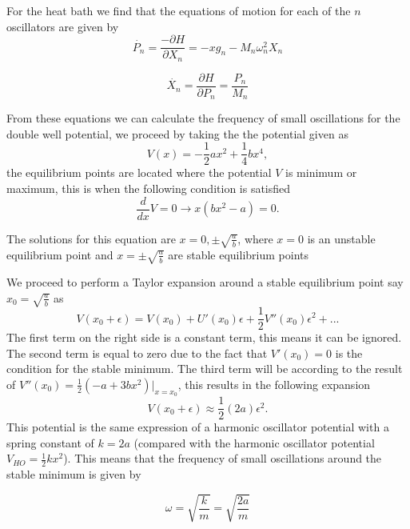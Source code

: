For the heat bath we find that the equations of motion for each of the $n$ oscillators are given by
\begin{equation}
\dot{P_n}=\frac{-\partial H}{\partial X_n}=-xg_n-M_n \omega _n ^2 X_n
\end{equation}

\begin{equation}
\dot{X_n}=\frac{\partial H}{\partial P_n}=\frac{P_n}{M_n}
\end{equation}

From these equations we can calculate the frequency of small oscillations for the double well potential, we proceed by taking the the potential given as
\begin{equation}
V(x)=-\frac{1}{2}ax^2+\frac{1}{4}bx^4,
\label{eq:potential}
\end{equation}
the equilibrium points are located where the potential $V$ is minimum or maximum, this is when the following condition is satisfied
\begin{equation}
\frac{d}{dx}V=0\rightarrow x(bx^2-a) = 0.
\end{equation}

The solutions for this equation are $x=0,\pm \sqrt{\frac{a}{b}}$, where $x=0$ is an unstable equilibrium point and $x=\pm \sqrt{\frac{a}{b}}$ are stable equilibrium points \par 
We proceed to perform a Taylor expansion around a stable equilibrium point say $x_0=\sqrt{\frac{a}{b}}$ as
\begin{equation}
V(x_0 +\epsilon )=V(x_0)+U'(x_0)\epsilon + \frac{1}{2}V''(x_0)\epsilon ^2 + ...
\end{equation}
The first term on the right side is a constant term, this means it can be ignored. The second term is equal to zero due to the fact that $V'(x_0)=0$ is the condition for the stable minimum. The third term will be according to the result of $V''(x_0)=\frac{1}{2}(-a+3bx^2)| _{x=x_0}$, this results in the following expansion
\begin{equation}
V(x_0+\epsilon)\approx \frac{1}{2}(2a)\epsilon ^2.
\end{equation}
This potential is the same expression of a harmonic oscillator potential with a spring constant of $k=2a$ (compared with the harmonic oscillator potential $V_{HO}=\frac{1}{2}kx^2$). This means that the frequency of small oscillations around the stable minimum is given by

\begin{equation}
\omega =\sqrt{\frac{k}{m}}=\sqrt{\frac{2a}{m}}
\label{eq:freq_small_oscillations}
\end{equation}

